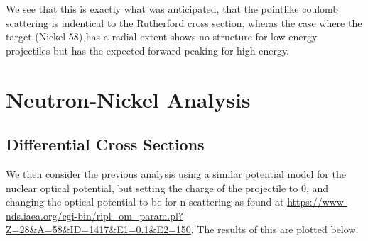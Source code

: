 \documentclass[paper=a4, fontsize=11pt]{scrartcl} %
\numberwithin{equation}{section} %
\numberwithin{figure}{section} %
\numberwithin{table}{section} %
\begin{document}
We see that this is exactly what was anticipated, that the pointlike coulomb scattering is indentical to the Rutherford cross section, wheras the case where the target (Nickel 58) has a radial extent shows no structure for low energy projectiles but has the expected forward peaking for high energy. \\
\newpage
\section{Neutron-Nickel Analysis}
\subsection{Differential Cross Sections}
We then consider the previous analysis using a similar potential model for the nuclear optical potential, but setting the charge of the projectile to 0, and changing the optical potential to be for n-scattering as found at \url{https://www-nds.iaea.org/cgi-bin/ripl_om_param.pl?Z=28&A=58&ID=1417&E1=0.1&E2=150}. The results of this are plotted below.\\
\end{document}
